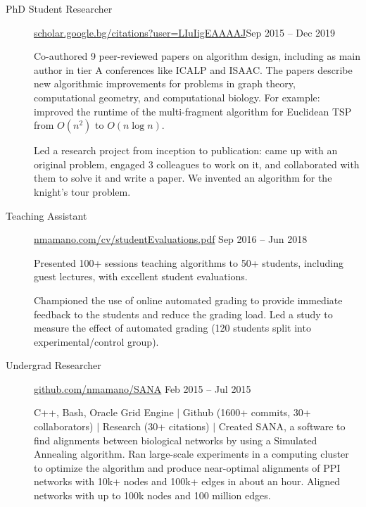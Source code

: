 \documentclass[letterpaper,10pt,oneside]{article}
\begin{document}
\begin{description}
\item[PhD Student Researcher]\quad \href{https://scholar.google.bg/citations?hl=en&user=LIuIigEAAAAJ}{scholar.google.bg/citations?user=LIuIigEAAAAJ}\hfill Sep 2015 -- Dec 2019

Co-authored 9 peer-reviewed papers on algorithm design, including as main author in tier A conferences like ICALP and ISAAC. The papers describe new algorithmic improvements for problems in graph theory, computational geometry, and computational biology. For example: improved the runtime of the multi-fragment algorithm for Euclidean TSP from $O(n^2)$ to $O(n\log n)$.

\vspace{2px}
\noindent Led a research project from inception to publication: came up with an original problem, engaged 3 colleagues to work on it, and collaborated with them to solve it and write a paper. We invented an algorithm for the knight's tour problem.

\item[Teaching Assistant]\quad \href{http://nmamano.com/cv/studentEvaluations.pdf}{nmamano.com/cv/studentEvaluations.pdf} \hfill Sep 2016 -- Jun 2018

Presented 100+ sessions teaching algorithms to 50+ students, including guest lectures, with excellent student evaluations.

\vspace{2px}
Championed the use of online automated grading to provide immediate feedback to the students and reduce the grading load. Led a study to measure the effect of automated grading (120 students split into experimental/control group).

\item[Undergrad Researcher]\quad \href{https://github.com/nmamano/SANA}{github.com/nmamano/SANA} \hfill Feb 2015 -- Jul 2015

C++, Bash, Oracle Grid Engine $|$ Github (1600+ commits, 30+ collaborators) $|$ Research (30+ citations) $|$ Created SANA, a software to find alignments between biological networks by using a Simulated Annealing algorithm. Ran large-scale experiments in a computing cluster to optimize the algorithm and produce near-optimal alignments of PPI networks with 10k+ nodes and 100k+ edges in about an hour. Aligned networks with up to 100k nodes and 100 million edges.
\end{description}
\end{document}
